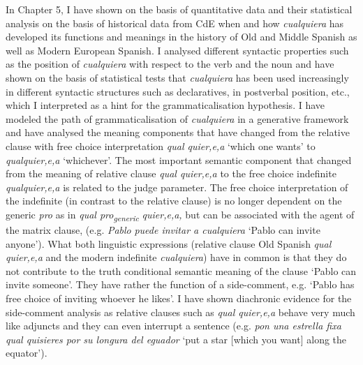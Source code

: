 \documentclass[output=paper]{langscibook}
\begin{document}
  In Chapter 5, I have shown on the basis of quantitative data and their statistical analysis on the basis of historical data from CdE when and how \textit{cualquiera} has developed its functions and meanings in the history of Old and Middle Spanish as well as Modern European Spanish. I analysed different syntactic properties such as the position of \textit{cualquiera} with respect to the verb and the noun and have shown on the basis of statistical tests that \textit{cualquiera} has been used increasingly in different syntactic structures such as declaratives, in postverbal position, etc., which I interpreted as a hint for the grammaticalisation hypothesis. I have modeled the path of grammaticalisation of \textit{cualquiera} in a generative framework and have analysed the meaning components that have changed from the relative clause with free choice interpretation \textit{qual quier,e,a} ‘which one wants’ to \textit{qualquier,e,a} ‘whichever’. The most important semantic component that changed from the meaning of relative clause \textit{qual quier,e,a} to the free choice indefinite \textit{qualquier,e,a} is related to the judge parameter. The free choice interpretation of the indefinite (in contrast to the relative clause) is no longer dependent on the generic \textit{pro} as in \textit{qual pro\textsubscript{generic}} \textit{quier,e,a,} but can be associated with the agent of the matrix clause, (e.g. \textit{Pablo} \textit{puede invitar a cualquiera} ‘Pablo can invite anyone’). What both linguistic expressions (relative clause Old Spanish \textit{qual quier,e,a} and the modern indefinite \textit{cualquiera}) have in common is that they do not contribute to the truth conditional semantic meaning of the clause ‘Pablo can invite someone’. They have rather the function of a side-comment, e.g. ‘Pablo has free choice of inviting whoever he likes’. I have shown diachronic evidence for the side-comment analysis as relative clauses such as \textit{qual quier,e,a} behave very much like adjuncts and they can even interrupt a sentence (e.g. \textit{pon una estrella fixa qual quisieres por su longura del eguador}  ‘put a star [which you want] along the equator’).
\end{document}
